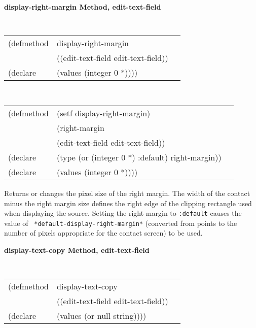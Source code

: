 {\samepage  
{\large {\bf display-right-margin \hfill Method, edit-text-field}}
\begin{flushright} \parbox[t]{6.125in}{
\tt
\begin{tabular}{lll}
\raggedright
(defmethod & display-right-margin & \\
& ((edit-text-field  edit-text-field)) \\
(declare & (values (integer 0 *))))
\end{tabular}
\rm

}\end{flushright}}

\begin{flushright} \parbox[t]{6.125in}{
\tt
\begin{tabular}{lll}
\raggedright
(defmethod & (setf display-right-margin) & \\
         & (right-margin \\
         & (edit-text-field  edit-text-field)) \\
(declare &(type (or (integer 0 *) :default)  right-margin))\\
(declare & (values (integer 0 *))))
\end{tabular}
\rm}
\end{flushright}

\begin{flushright} \parbox[t]{6.125in}{
Returns or changes the pixel size of the
right margin.  The width of the contact minus the right margin size defines
the right edge of the clipping rectangle used when displaying the source.
Setting the right margin to {\tt :default} causes the value of {\tt
*default-display-right-margin*} (converted from points to the number of pixels
appropriate for the contact screen) to be used.
}
\end{flushright}


{\samepage
{\large {\bf display-text-copy \hfill Method, edit-text-field}}
\begin{flushright} \parbox[t]{6.125in}{
\tt
\begin{tabular}{lll}
\raggedright
(defmethod & display-text-copy & \\
           & ((edit-text-field  edit-text-field)) \\
(declare   & (values (or null string))))
\end{tabular}
\rm

}\end{flushright}}

